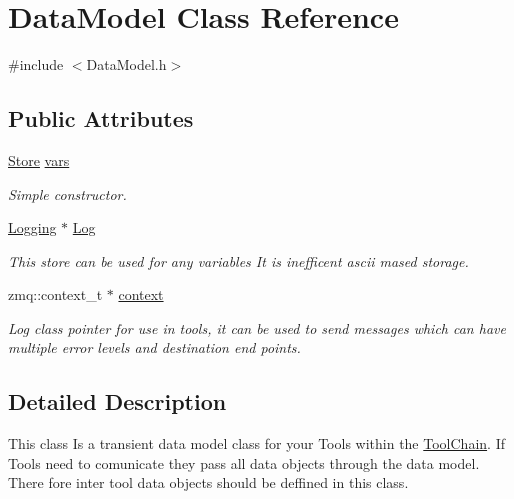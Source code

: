 \hypertarget{classDataModel}{\section{Data\-Model Class Reference}
\label{classDataModel}
}


{\ttfamily \#include $<$Data\-Model.\-h$>$}

\subsection*{Public Attributes}
\begin{DoxyCompactItemize}
\item 
\hypertarget{classDataModel_a4baac5fe364a7a23762d70d2c2216486}{\hyperlink{classStore}{Store} \hyperlink{classDataModel_a4baac5fe364a7a23762d70d2c2216486}{vars}}\label{classDataModel_a4baac5fe364a7a23762d70d2c2216486}

\begin{DoxyCompactList}\small\item\em Simple constructor. \end{DoxyCompactList}\item 
\hypertarget{classDataModel_aa777da4c632e4659ee5b1447ad513458}{\hyperlink{classLogging}{Logging} $\ast$ \hyperlink{classDataModel_aa777da4c632e4659ee5b1447ad513458}{Log}}\label{classDataModel_aa777da4c632e4659ee5b1447ad513458}

\begin{DoxyCompactList}\small\item\em This store can be used for any variables It is inefficent ascii mased storage. \end{DoxyCompactList}\item 
\hypertarget{classDataModel_a2c6dfd692e50f90e55338970ea7f8d61}{zmq\-::context\-\_\-t $\ast$ \hyperlink{classDataModel_a2c6dfd692e50f90e55338970ea7f8d61}{context}}\label{classDataModel_a2c6dfd692e50f90e55338970ea7f8d61}

\begin{DoxyCompactList}\small\item\em Log class pointer for use in tools, it can be used to send messages which can have multiple error levels and destination end points. \end{DoxyCompactList}\end{DoxyCompactItemize}


\subsection{Detailed Description}
This class Is a transient data model class for your Tools within the \hyperlink{classToolChain}{Tool\-Chain}. If Tools need to comunicate they pass all data objects through the data model. There fore inter tool data objects should be deffined in this class.

